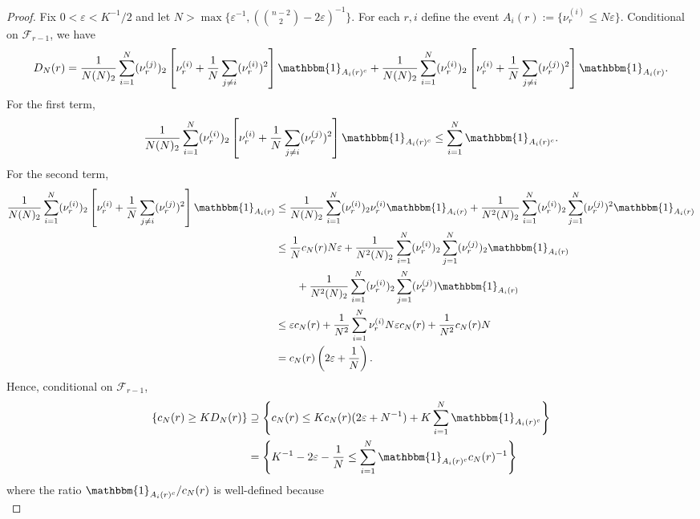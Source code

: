\documentclass{article}
\newcommand{\1}[1]{\mathbbm{1}_{#1}}
\begin{document}
\begin{proof}
Fix $0 < \varepsilon < K^{-1}/2$ and let $N > \max\{ \varepsilon^{-1}, (\binom{n-2}{2} - 2\varepsilon)^{-1} \}$. For each $r,i$ define the event $A_i(r) := \{ \nu_r^{(i)} \leq N\varepsilon \}$.
Conditional on $\mathcal{F}_{r-1}$, we have
\begin{equation}
D_N(r)
= \frac{1}{N(N)_2} \sum_{i=1}^N (\nu_r^{(j)})_2 \left[ \nu_r^{(i)} 
        + \frac{1}{N} \sum_{j\neq i} (\nu_r^{(i)})^2 \right] \1{A_i(r)^c}
        + \frac{1}{N(N)_2} \sum_{i=1}^N (\nu_r^{(i)})_2 \left[ \nu_r^{(i)} 
        + \frac{1}{N} \sum_{j\neq i} (\nu_r^{(j)})^2 \right] \1{A_i(r)} .
\end{equation}
For the first term, 
\begin{equation}
\frac{1}{N(N)_2} \sum_{i=1}^N (\nu_r^{(i)})_2 \left[ \nu_r^{(i)} 
        + \frac{1}{N} \sum_{j\neq i} (\nu_r^{(j)})^2 \right] \1{A_i(r)^c}
\leq \sum_{i=1}^N \1{A_i(r)^c} .
\end{equation}
For the second term,
\begin{align}
\frac{1}{N(N)_2} \sum_{i=1}^N (\nu_r^{(i)})_2 \left[ \nu_r^{(i)} 
        + \frac{1}{N} \sum_{j\neq i} (\nu_r^{(j)})^2 \right] \1{A_i(r)}
&\leq \frac{1}{N(N)_2} \sum_{i=1}^N (\nu_r^{(i)})_2 \nu_r^{(i)} \1{A_i(r)} 
        + \frac{1}{N^2(N)_2} \sum_{i=1}^N (\nu_r^{(i)})_2 \sum_{j=1}^N 
        (\nu_r^{(j)})^2 \1{A_i(r)} \notag\\
&\leq \frac{1}{N} c_N(r) N\varepsilon
        + \frac{1}{N^2(N)_2} \sum_{i=1}^N (\nu_r^{(i)})_2 \sum_{j=1}^N 
        (\nu_r^{(j)})_2 \1{A_i(r)} \notag\\
    &\qquad+ \frac{1}{N^2(N)_2} \sum_{i=1}^N (\nu_r^{(i)})_2 \sum_{j=1}^N 
        (\nu_r^{(j)}) \1{A_i(r)} \notag\\
&\leq \varepsilon c_N(r) 
        + \frac{1}{N^2} \sum_{i=1}^N \nu_r^{(i)} N\varepsilon c_N(r) 
        + \frac{1}{N^2} c_N(r) N \notag\\
&= c_N(r) \left( 2\varepsilon + \frac{1}{N} \right).
\end{align}
Hence, conditional on $\mathcal{F}_{r-1}$,
\begin{align}
\left\{ c_N(r) \geq K D_N(r) \right\}
&\supseteq \left\{ c_N(r) \leq K c_N(r) (2\varepsilon + N^{-1}) 
        + K \sum_{i=1}^N \1{A_i(r)^c} \right\} \notag\\
&=\left\{ K^{-1} - 2\varepsilon- \frac{1}{N} \leq 
        \sum_{i=1}^N \1{A_i(r)^c} c_N(r)^{-1} \right\} 
\end{align}
where the ratio $\1{A_i(r)^c} / c_N(r)$ is well-defined because
\begin{equation}

\end{equation}
\end{proof}
\end{document}
